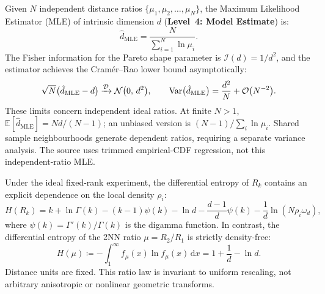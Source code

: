 \begin{proposition}
  \label{prop:2nn_mle}
  Given $N$ independent distance ratios $\{\mu_1, \mu_2, \dots,
  \mu_N\}$, the Maximum Likelihood Estimator (\ac{MLE}) of intrinsic
  dimension $d$ (\textbf{Level~4: Model Estimate}) is:
  \begin{equation}
    \hat{d}_{\mathrm{MLE}} = \frac{N}{\sum_{i=1}^N \ln \mu_i}.
    \label{eq:2nn_mle}
  \end{equation}
  The Fisher information for the Pareto shape parameter is
  $\mathcal{I}(d) = 1/d^2$, and the estimator achieves the
  Cram\'er--Rao lower bound asymptotically:
  \begin{equation}
    \sqrt{N} \bigl(\hat{d}_{\mathrm{MLE}} - d\bigr)
    \xrightarrow{\mathcal{D}} \mathcal{N}\bigl(0, \, d^2\bigr),
    \qquad \operatorname{Var}\bigl(\hat{d}_{\mathrm{MLE}}\bigr) = \frac{d^2}{N} +
    \mathcal{O}\bigl(N^{-2}\bigr).
    \label{eq:2nn_asymptotic_var}
  \end{equation}
  These limits concern independent ideal ratios. At finite $N>1$,
  $\mathbb{E}[\hat d_{\mathrm{MLE}}]=Nd/(N-1)$; an unbiased version
  is $(N-1)/\sum_i\ln\mu_i$. Shared sample neighbourhoods generate
  dependent ratios, requiring a separate variance analysis. The source
  uses trimmed empirical-CDF regression, not this independent-ratio MLE.
\end{proposition}

\begin{theorem}
  \label{thm:excess_entropy}
  Under the ideal fixed-rank experiment, the differential entropy of $R_k$
  contains an explicit dependence on the local density $\rho_i$:
  \begin{equation}
    H(R_k) = k + \ln \Gamma(k) - (k - 1)\psi(k) - \ln d - \frac{d -
    1}{d}\psi(k) - \frac{1}{d}\ln(N \rho_i \omega_d),
    \label{eq:shannon_rk}
  \end{equation}
  where $\psi(k) = \Gamma'(k)/\Gamma(k)$ is the digamma function. In
  contrast, the differential entropy of the 2NN ratio $\mu =
  R_2/R_1$ is strictly density-free:
  \begin{equation}
    H(\mu) \coloneqq -\int_1^\infty f_\mu(x) \ln f_\mu(x) \,
    \mathrm{d}x = 1 + \frac{1}{d} - \ln d.
    \label{eq:excess_entropy}
  \end{equation}
  Distance units are fixed. This ratio law is invariant to uniform
  rescaling, not arbitrary anisotropic or nonlinear geometric transforms.
\end{theorem}

